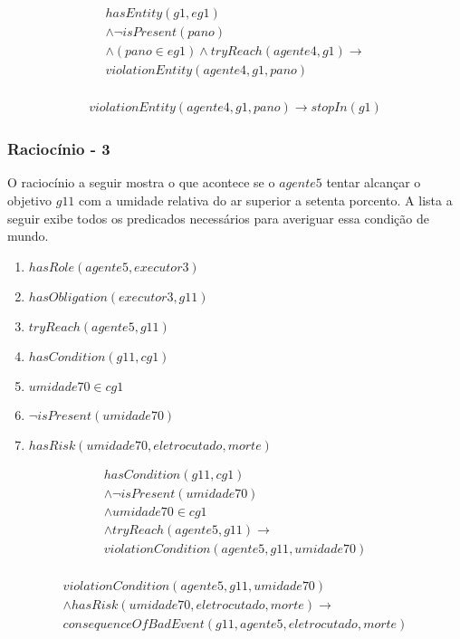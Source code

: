 \begin{eqnarray}\nonumber
	hasEntity(g1,eg1) \nonumber \\ 
	\wedge \neg isPresent(pano) 	\nonumber \\ 
	\wedge (pano \in eg1) \wedge tryReach(agente4,g1) \to \nonumber \\ 
	violationEntity(agente4,g1,pano) \nonumber \\
\end{eqnarray}

\begin{eqnarray}
	violationEntity(agente4,g1,pano) \to stopIn(g1)
\end{eqnarray}



\subsubsection{Raciocínio - 3} 
\label{raciocinio3}
O raciocínio a seguir mostra o que acontece se o $agente5$ tentar alcançar o objetivo $g11$ com a umidade relativa do ar superior a setenta porcento. A lista a seguir exibe todos os predicados necessários para averiguar essa condição de mundo. 

\begin{enumerate}
	\item $hasRole(agente5,executor3)$
	\item $hasObligation(executor3,g11)$	
	\item $tryReach(agente5,g11)$ 
	\item $hasCondition(g11,cg1)$
	\item $umidade70 \in cg1$	
	\item $\neg isPresent(umidade70)$
	\item $hasRisk(umidade70,eletrocutado,morte)$
\end{enumerate}

\begin{eqnarray}
	hasCondition(g11,cg1) \nonumber \\ 
	\wedge \neg isPresent(umidade70) \nonumber \\
	\wedge umidade70 \in cg1 \nonumber \\
	\wedge tryReach(agente5,g11) \to \nonumber \\  
	violationCondition(agente5,g11,umidade70) \nonumber \\
\end{eqnarray}

\begin{eqnarray} \nonumber
	violationCondition(agente5,g11,umidade70) \nonumber \\
	\wedge hasRisk(umidade70,eletrocutado,morte) \to \nonumber \\  
	consequenceOfBadEvent(g11,agente5,eletrocutado,morte)
\end{eqnarray}


